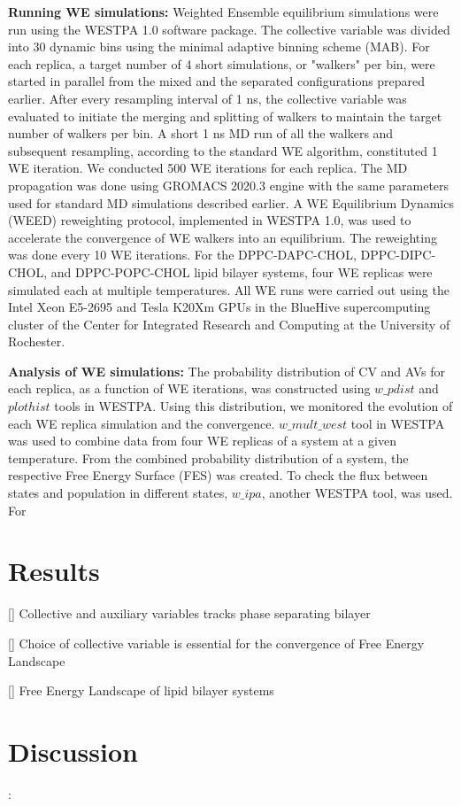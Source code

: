 \documentclass{biophys-new}
\begin{document}
\textbf{Running WE simulations:} 
Weighted Ensemble equilibrium simulations were run using the WESTPA 1.0 software package\cite{Zwier2015}.
The collective variable was divided into 30 dynamic bins using the minimal adaptive binning scheme (MAB)\cite{Torrillo2021}.
For each replica, a target number of 4 short simulations, or "walkers" per bin, were started in parallel from the mixed and the separated configurations prepared earlier.
After every resampling interval of 1 ns, the collective variable was evaluated to initiate the merging and splitting of walkers to maintain the target number of walkers per bin.
A short 1 ns MD run of all the walkers and subsequent resampling, according to the standard WE algorithm, constituted 1 WE iteration. 
We conducted 500 WE iterations for each replica.
The MD propagation was done using GROMACS 2020.3 engine with the same parameters used for standard MD simulations described earlier.
A WE Equilibrium Dynamics (WEED) reweighting protocol\cite{Bhatt2010}, implemented in WESTPA 1.0, was used to accelerate the convergence of WE walkers into an equilibrium. 
The reweighting was done every 10 WE iterations.
For the DPPC-DAPC-CHOL, DPPC-DIPC-CHOL, and DPPC-POPC-CHOL lipid bilayer systems, four WE replicas were simulated each at multiple temperatures. 
All WE runs were carried out using the Intel Xeon E5-2695 and Tesla K20Xm GPUs in the BlueHive supercomputing cluster of the Center for Integrated Research and
Computing at the University of Rochester.   

\textbf{Analysis of WE simulations:}
The probability distribution of CV and AVs for each replica, as a function of WE iterations, was constructed using $w\_pdist$ and $plothist$ tools in WESTPA.
Using this distribution, we monitored the evolution of each WE replica simulation and the convergence.
$w\_mult\_west$ tool in WESTPA was used to combine data from four WE replicas of a system at a given temperature.
From the combined probability distribution of a system, the respective Free Energy Surface (FES) was created.
To check the flux between states and population in different states, $w\_ipa$, another WESTPA tool, was used.
For 



\section*{Results}

[] Collective and auxiliary variables tracks phase separating bilayer

[] Choice of collective variable is essential for the convergence of Free Energy Landscape

[] Free Energy Landscape of lipid bilayer systems


\section*{Discussion}:





\end{document}
